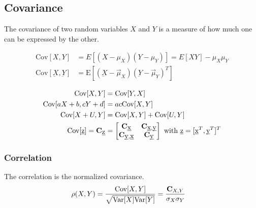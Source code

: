 \begin{mdframed}[style=eqbox]
  \subsection{Covariance}
  The covariance of two random variables $X$ and $Y$ is a measure of how much one can be expressed by the other.
  \begin{mdframed}[style=redbox]
    \vspace*{-11pt}
    \begin{align*}
      \text{Cov}[X,Y] &= E[(X-\mu_X)(Y-\mu_Y)] = E[XY] - \mu_X\mu_Y\\
      \text{Cov}[\underbar{X},\underbar{Y}] &= \text{E}[(\underbar{X} - \vec{\mu}_X)(\underbar{Y} - \vec{\mu}_Y)^T]
    \end{align*}
  \end{mdframed}
  \vspace*{-9pt}\begin{align*}
    \text{Cov}[X,Y] &= \text{Cov}[Y,X]\\
    \text{Cov}[aX + b, cY + d] &= ac \text{Cov}[X,Y]\\
    \text{Cov}[X + U, Y] &= \text{Cov}[X,Y] + \text{Cov}[U,Y]\\
    \text{Cov}[\underbar{z}] = \mathbf{C}_{\underbar{z}} &= \begin{bmatrix}
      \mathbf{C}_{\underbar{x}} & \mathbf{C}_{\underbar{x},\underbar{y}}\\
      \mathbf{C}_{\underbar{y},\underbar{x}} & \mathbf{C}_{\underbar{y}}
    \end{bmatrix} \text{~with~} \underbar{z} = [\underbar{x}^T, \underbar{y}^T]^T
  \end{align*}
  \vspace*{-20pt}\subsubsection{Correlation}
  The correlation is the normalized covariance.
  \begin{align*}
    \rho(X,Y) &= \frac{\text{Cov}[X,Y]}{\sqrt{\text{Var}[X]\text{Var}[Y]}} = \frac{\mathbf{C}_{X,Y}}{\sigma_X \sigma_Y}
  \end{align*}
\end{mdframed}

